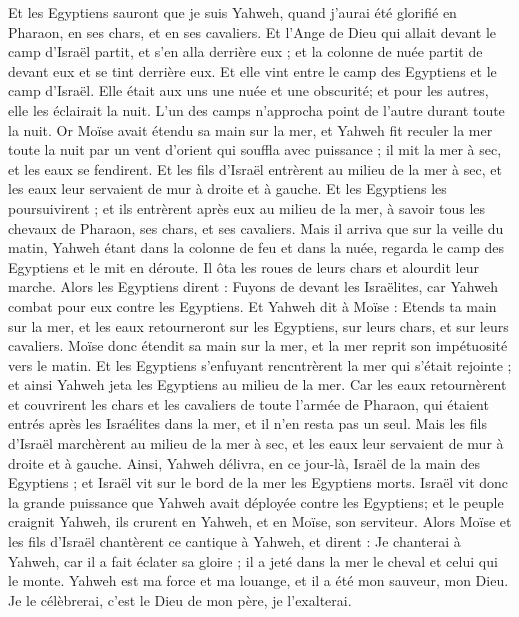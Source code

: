 \begin{multicols}{2}
Et les Egyptiens sauront que je suis Yahweh, quand j'aurai été glorifié en Pharaon, en ses chars, et en ses cavaliers.
Et l'Ange de Dieu qui allait devant le camp d'Israël partit, et s'en alla derrière eux ; et la colonne de nuée partit de devant eux et se tint derrière eux.
Et elle vint entre le camp des Egyptiens et le camp d'Israël. Elle était aux uns une nuée et une obscurité; et pour les autres, elle les éclairait la nuit. L'un des camps n'approcha point de l'autre durant toute la nuit.
Or Moïse avait étendu sa main sur la mer, et Yahweh fit reculer la mer toute la nuit par un vent d'orient qui souffla avec puissance ; il mit la mer à sec, et les eaux se fendirent.
Et les fils d'Israël entrèrent au milieu de la mer à sec, et les eaux leur servaient de mur à droite et à gauche.
Et les Egyptiens les poursuivirent ; et ils entrèrent après eux au milieu de la mer, à savoir tous les chevaux de Pharaon, ses chars, et ses cavaliers.
Mais il arriva que sur la veille du matin, Yahweh étant dans la colonne de feu et dans la nuée, regarda le camp des Egyptiens et le mit en déroute.
Il ôta les roues de leurs chars et alourdit leur marche. Alors les Egyptiens dirent : Fuyons  de devant les Israëlites, car Yahweh combat pour eux contre les Egyptiens.
Et Yahweh dit à Moïse : Etends ta main sur la mer, et les eaux retourneront sur les Egyptiens, sur leurs chars, et sur leurs cavaliers.
Moïse donc étendit sa main sur la mer, et la mer reprit son impétuosité vers le matin. Et les Egyptiens s'enfuyant rencntrèrent la mer qui s'était rejointe ; et ainsi Yahweh jeta les Egyptiens au milieu de la mer.
Car les eaux retournèrent et couvrirent les chars et les cavaliers de toute l'armée de Pharaon, qui étaient entrés après les Israélites dans la mer, et il n'en resta pas un seul.
Mais les fils d'Israël marchèrent au milieu de la mer à sec, et les eaux leur servaient de mur à droite et à gauche.
Ainsi, Yahweh délivra, en ce jour-là, Israël de la main des Egyptiens ; et Israël vit sur le bord de la mer les Egyptiens morts.
Israël vit donc la grande puissance que Yahweh avait déployée contre les Egyptiens; et le peuple craignit Yahweh, ils crurent en Yahweh, et en Moïse, son serviteur.
\VerseOne{}Alors Moïse et les fils d'Israël chantèrent ce cantique à Yahweh, et dirent : Je chanterai à Yahweh, car il a fait éclater sa gloire ; il a jeté dans la mer le cheval et celui qui le monte.
Yahweh est ma force et ma louange, et il a été mon sauveur, mon Dieu. Je le célèbrerai, c'est le Dieu de mon père, je l'exalterai.

\end{multicols}
